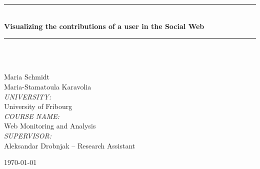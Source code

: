 \documentclass[a4paper,12pt]{article}
\begin{document}

\begin{titlepage}
\begin{center}


\rule{\linewidth}{0.5mm} \\[0.4cm]
{ \huge \bfseries Visualizing the contributions of a user in the Social Web \\[0.4cm] }
\rule{\linewidth}{0.5mm} \\[1.5cm]

\vspace{8cm}
\begin{minipage}{ 0.4 \textwidth}
\begin{flushleft} \small
{}\\
Maria Schmidt\\
Maria-Stamatoula Karavolia \\
\vspace{1cm}
\emph{UNIVERSITY:}\\
University of Fribourg\\ 
\emph{COURSE NAME:}\\
Web Monitoring and Analysis\\ 
\emph{SUPERVISOR:}\\
Aleksandar Drobnjak – Research Assistant\\
\end{flushleft}
\end{minipage}


\vfill

{\large \today}

\end{center}
\end{titlepage}

\tableofcontents

\clearpage
\listoffigures



\pagestyle{fancy}

\clearpage








\clearpage




\clearpage
\end{document}
